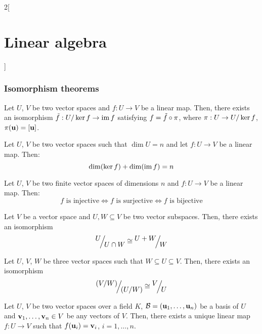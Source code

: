 \documentclass[../../../main.tex]{subfiles}
\begin{document}
\begin{multicols}{2}[\section{Linear algebra}]
  \subsubsection{Isomorphism theorems}
  \begin{theorem}
    Let $U$, $V$ be two vector spaces and $f:U\rightarrow V$ be a linear map. Then, there exists an isomorphism $\Tilde{f}:\quot{U}{\ker f}\rightarrow \im f$ satisfying $f=\Tilde{f}\circ\pi$, where $\pi:U\rightarrow \quot{U}{\ker f}$, $\pi(\boldsymbol{\mathrm{u}})=[\boldsymbol{\mathrm{u}}]$.
    \begin{center}
      \begin{minipage}{\linewidth}
        \centering
        
      \end{minipage}
    \end{center}
  \end{theorem}
  \begin{corollary}
    Let $U$, $V$ be two vector spaces such that $\dim U=n$ and let $f:U\rightarrow V$ be a linear map. Then: $$\dim(\ker f)+\dim(\operatorname{im} f)=n$$
  \end{corollary}
  \begin{corollary}
    Let $U$, $V$ be two finite vector spaces of dimensions $n$ and $f:U\rightarrow V$ be a linear map. Then: $$f\text{ is injective}\iff f\text{ is surjective}\iff f\text{ is bijective}$$
  \end{corollary}
  \begin{theorem}
    Let $V$ be a vector space and $U,W\subseteq V$ be two vector subspaces. Then, there exists an isomorphism $$\quot{U}{U\cap W}\cong\quot{U+W}{W}$$
  \end{theorem}
  \begin{theorem}
    Let $U$, $V$, $W$ be three vector spaces such that $W\subseteq U\subseteq V$. Then, there exists an isomorphism $$\quot{{(\textstyle\quot{V}{W})}}{{(\textstyle\quot{U}{W})}}\cong\quot{V}{U}$$
  \end{theorem}
  \begin{theorem}
    Let $U$, $V$ be two vector spaces over a field $K$, $\mathcal{B}=(\boldsymbol{\mathrm{u}}_1,\ldots,\boldsymbol{\mathrm{u}}_n)$ be a basis of $U$ and $\boldsymbol{\mathrm{v}}_1,\ldots,\boldsymbol{\mathrm{v}}_n\in V$ be any vectors of $V$. Then, there exists a unique linear map $f:U\rightarrow V$ such that $f(\boldsymbol{\mathrm{u}}_i)=\boldsymbol{\mathrm{v}}_i$, $i=1,\ldots,n$.
  \end{theorem}

\end{multicols}
\end{document}

